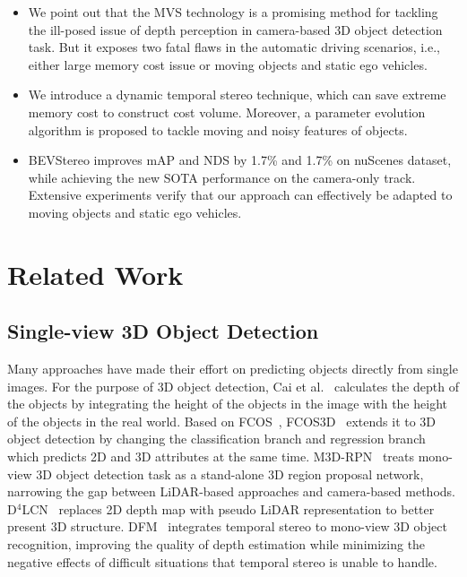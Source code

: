\documentclass[letterpaper]{article} \usepackage[]{aaai23}  \usepackage{times}  \usepackage{helvet}  \usepackage{courier}  \usepackage[hyphens]{url}  \usepackage{graphicx} \urlstyle{rm} \def\UrlFont{\rm}  \usepackage{natbib}  \usepackage{caption} \frenchspacing  \setlength{\pdfpagewidth}{8.5in} \setlength{\pdfpageheight}{11in} \usepackage{algorithm}
\begin{document}
\begin{itemize}
\item We point out that the MVS technology is a promising method for tackling the ill-posed issue of depth perception in camera-based 3D object detection task. But it exposes two fatal flaws in the automatic driving scenarios, i.e., either large memory cost issue or moving objects and static ego vehicles.

\item We introduce a dynamic temporal stereo technique, which can save extreme memory cost to construct cost volume. Moreover, a parameter evolution algorithm is proposed to tackle moving and noisy features of objects. 



\item BEVStereo improves mAP and NDS by 1.7\% and 1.7\% on nuScenes dataset, while achieving the new SOTA performance on the camera-only track. Extensive experiments verify that our approach can effectively be adapted to moving objects and static ego vehicles.






\end{itemize}








\section{Related Work}
\subsection{Single-view 3D Object Detection}
Many approaches have made their effort on predicting objects directly from single images. For the purpose of 3D object detection, Cai et al.~\cite{cai2020monocular} calculates the depth of the objects by integrating the height of the objects in the image with the height of the objects in the real world. Based on FCOS~\cite{tian2019fcos}, FCOS3D~\cite{wang2021fcos3d} extends it to 3D object detection by changing the  classification branch and regression branch which predicts 2D and 3D attributes at the same time. M3D-RPN~\cite{brazil2019m3d} treats mono-view 3D object detection task as a stand-alone 3D region proposal network, narrowing the gap between LiDAR-based approaches and camera-based methods. D$^4$LCN~\cite{ding2020learning} replaces 2D depth map with pseudo LiDAR representation to better present 3D structure. DFM~\cite{wang2022monocular} integrates temporal stereo to mono-view 3D object recognition, improving the quality of depth estimation while minimizing the negative effects of difficult situations that temporal stereo is unable to handle.
\end{document}

